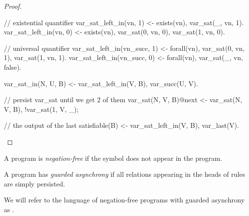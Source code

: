 \begin{proof}
\begin{Dedalus}
// existential quantifier
var_sat_left_in(vn, 1) <- exists(vn),
var_sat(_, vn, 1).
var_sat_left_in(vn, 0) <- exists(vn),
var_sat(0, vn, 0), var_sat(1, vn, 0).

// universal quantifier
var_sat_left_in(vn_succ, 1) <- forall(vn),
var_sat(0, vn, 1), var_sat(1, vn, 1).
var_sat_left_in(vn_succ, 0) <- forall(vn),
var_sat(_, vn, false).

var_sat_in(N, U, B) <- var_sat_left_in(V, B),
var_succ(U, V).

// persist var_sat until we get 2 of them
var_sat(N, V, B)@next <- var_sat(N, V, B),
!var_sat(1, V, _);

// the output of the last 
satisfiable(B) <- var_sat_left_in(V, B), var_last(V).
\end{Dedalus}
\end{proof}




\begin{definition}
A \lang program is {\em negation-free} if the \dedalus{!} symbol does not appear in the program.
\end{definition}


\begin{definition}
A \lang program has {\em guarded asynchrony} if all relations
appearing in the heads of  rules
are simply persisted. 
\end{definition}

We will refer to the language of negation-free \lang programs with guarded asynchrony as \slang.

